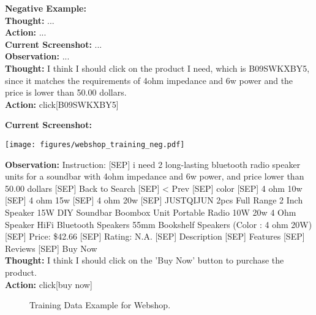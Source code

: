 \begin{tcolorbox}[breakable,title=Training Data Example for Webshop]
\textcolor{my_green!50}{\textbf{Negative Example:} }\\
\textcolor{my_purple}{\textbf{Thought:} ...}\\
\textcolor{my_purple}{\textbf{Action:} ...}\\
\textcolor{my_blue!50}{\textbf{Current Screenshot:} ...}\\
\textcolor{my_blue!50}{\textbf{Observation:} ...}\\
\textcolor{my_purple}{\textbf{Thought:} I think I should click on the product I need, which is B09SWKXBY5, since it matches the requirements of 4ohm impedance and 6w power and the price is lower than 50.00 dollars.}\\
\textcolor{my_purple}{\textbf{Action:} click[B09SWKXBY5]}\\
\textcolor{my_blue!50}{\textbf{Current Screenshot:} \begin{center}\texttt{[image: figures/webshop\_training\_neg.pdf]}\end{center}}
\textcolor{my_blue!50}{\textbf{Observation:} Instruction: [SEP] i need 2 long-lasting bluetooth radio speaker units for a soundbar with 4ohm impedance and 6w power, and price lower than 50.00 dollars [SEP] Back to Search [SEP] < Prev [SEP] color [SEP] 4 ohm 10w [SEP] 4 ohm 15w [SEP] 4 ohm 20w [SEP] JUSTQIJUN 2pcs Full Range 2 Inch Speaker 15W DIY Soundbar Boombox}
\textcolor{my_blue!50}{Unit Portable Radio 10W 20w 4 Ohm Speaker HiFi Bluetooth Speakers 55mm Bookshelf Speakers (Color : 4 ohm 20W) [SEP] Price: \$42.66 [SEP] Rating: N.A. [SEP] Description [SEP] Features [SEP] Reviews [SEP] Buy Now}\\
\textcolor{my_purple}{\textbf{Thought:} I think I should click on the 'Buy Now' button to purchase the product.}\\
\textcolor{my_purple}{\textbf{Action:} click[buy now]}
\end{tcolorbox}
\begin{figure}[!htp]
    \centering
    \vspace{-16pt}
    \caption{
    Training Data Example for Webshop.
    }
    \label{fig:train_data_webshop}
\end{figure}


